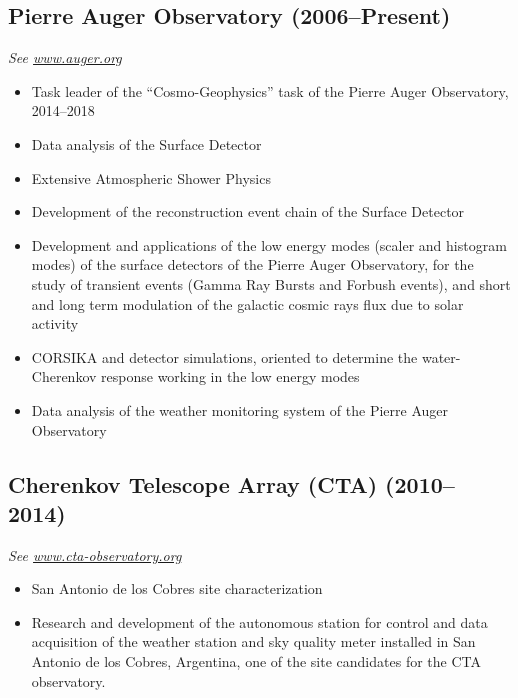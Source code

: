 \subsection*{Pierre Auger Observatory (2006--Present)}
{\small{\textit{See \href{http://www.auger.org/}{www.auger.org}}}}
\begin{itemize}
\item Task leader of the ``Cosmo-Geophysics'' task of the Pierre Auger Observatory, 2014--2018
\item Data analysis of the Surface Detector
\item Extensive Atmospheric Shower Physics
\item Development of the reconstruction event chain of the Surface Detector
\item Development and applications of the low energy modes (scaler and histogram
modes) of the surface detectors of the Pierre Auger Observatory, for the study
of transient events (Gamma Ray Bursts and Forbush events), and short and long
term modulation of the galactic cosmic rays flux due to solar activity
\item CORSIKA and detector simulations, oriented to determine the
water-Cherenkov response working in the low energy modes
\item Data analysis of the weather monitoring system of the Pierre Auger
Observatory
\end{itemize}
\subsection*{Cherenkov Telescope Array (CTA) (2010--2014)}
{\small{\textit{See \href{http://www.cta-observatory.org}{www.cta-observatory.org}}}}
\begin{itemize}
\item San Antonio de los Cobres site characterization
\item Research and development of the autonomous station for control and data
acquisition of the weather station and sky quality meter installed in San
Antonio de los Cobres, Argentina, one of the site candidates for the CTA
observatory.
\end{itemize}
\fi

